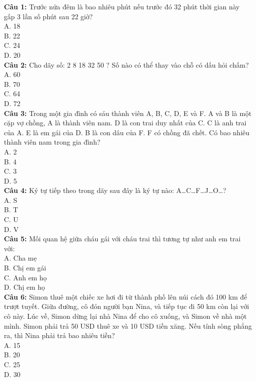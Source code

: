 \begin{multicols}{2}
\noindent
\textbf{Câu 1:} Trước nửa đêm là bao nhiêu phút nếu trước đó 32 phút thời gian này gấp 3 lần số phút sau 22 giờ? \\
A. 18 \\
B. 22 \\
C. 24 \\
D. 20 \\

\textbf{Câu 2:} Cho dãy số: 2 8 18 32 50 ? Số nào có thể thay vào chỗ có dấu hỏi chấm? \\
A. 60 \\
B. 70 \\
C. 64 \\
D. 72 \\

\textbf{Câu 3:} Trong một gia đình có sáu thành viên A, B, C, D, E và F. A và B là một cặp vợ chồng, A là thành viên nam. D là con trai duy nhất của C. C là anh trai của A. E là em gái của D. B là con dâu của F. F có chồng đã chết. Có bao nhiêu thành viên nam trong gia đình? \\
A. 2 \\
B. 4 \\
C. 3 \\
D. 5 \\

\textbf{Câu 4:} Ký tự tiếp theo trong dãy sau đây là ký tự nào: A…C…F…J…O…? \\
A. S \\
B. T \\
C. U \\
D. V \\

\textbf{Câu 5:} Mối quan hệ giữa cháu gái với cháu trai thì tương tự như anh em trai với: \\
A. Cha mẹ \\
B. Chị em gái \\
C. Anh em họ \\
D. Chị em họ \\

\textbf{Câu 6:} Simon thuê một chiếc xe hơi đi từ thành phố lên núi cách đó 100 km để trượt tuyết. Giữa đường, cô đón người bạn Nina, và tiếp tục đi 50 km còn lại với cô này. Lúc về, Simon dừng lại nhà Nina để cho cô xuống, và Simon về nhà một mình. Simon phải trả 50 USD thuê xe và 10 USD tiền xăng. Nếu tính sòng phẳng ra, thì Nina phải trả bao nhiêu tiền? \\
A. 15 \\
B. 20 \\
C. 25 \\
D. 30 \\


\end{multicols}
